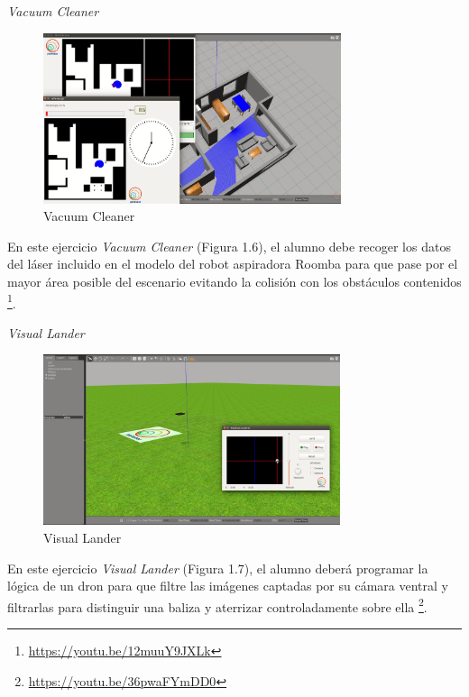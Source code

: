 \vspace{4cm}
\hspace{0.40\linewidth}
\textit{Vacuum Cleaner}

\begin{figure}[H]
  \begin{center}
    \includegraphics[width=0.50\linewidth, height=5cm]{figures/vacuumcleaner.png}
		\caption{Vacuum Cleaner}
		\label{fig.vacuumcleaner}
		\end{center}
\end{figure}

En este ejercicio \textit{Vacuum Cleaner} (Figura 1.6), el alumno debe recoger los datos del láser incluido en el modelo del robot aspiradora Roomba para que pase por el mayor área posible del escenario evitando la colisión con los obstáculos contenidos \footnote{\url{https://youtu.be/12muuY9JXLk}}.

\vspace{4cm}
\hspace{0.40\linewidth}
\textit{Visual Lander}

\begin{figure}[H]
  \begin{center}
    \includegraphics[width=0.50\linewidth, height=5cm]{figures/visuallander.png}
		\caption{Visual Lander}
		\label{fig.visual lander}
		\end{center}
\end{figure}

En este ejercicio \textit{Visual Lander} (Figura 1.7), el alumno deberá programar la lógica de un dron para que filtre las imágenes captadas por su cámara ventral y filtrarlas para distinguir una baliza y aterrizar controladamente sobre ella \footnote{\url{https://youtu.be/36pwaFYmDD0}}.

